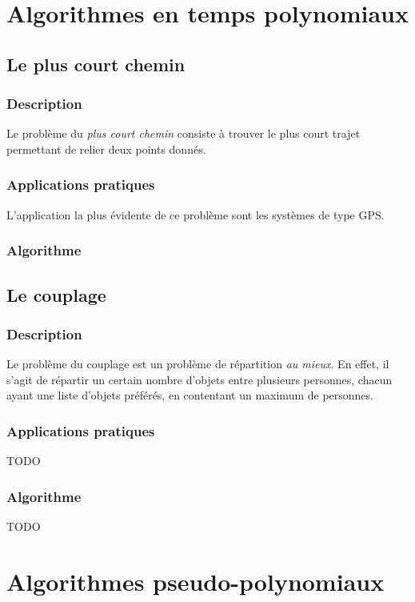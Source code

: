 \section{Algorithmes en temps polynomiaux}
    \subsection{Le plus court chemin}
        \subsubsection{Description}
        Le problème du \emph{plus court chemin} consiste à trouver
        le plus court trajet permettant de relier deux points donnés.
        \subsubsection{Applications pratiques}
            L'application la plus évidente de ce problème sont les systèmes de type
            GPS.
        \subsubsection{Algorithme}

    \subsection{Le couplage}
        \subsubsection{Description}
            Le problème du couplage est un problème de répartition \emph{au mieux}.
            En effet, il s'agit de répartir un certain nombre d'objets
            entre plusieurs personnes, chacun ayant une liste d'objets
            préférés, en contentant un maximum de personnes.
        \subsubsection{Applications pratiques}
            TODO
        \subsubsection{Algorithme}
            TODO



\section{Algorithmes pseudo-polynomiaux}
